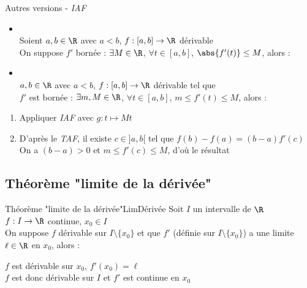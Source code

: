 \documentclass[12pt,a4paper]{report}
\begin{document}
\pagebreak

\begin{theoreme}{Autres versions - \textit{IAF}}{}
\begin{itemize}
    \item {} \\
    Soient $a,b \in \R$ avec $a<b$, $f:[a,b]\to \R$ dérivable\\
    On suppose $f'$ bornée : $\exists M \in \R$, $\forall t \in [a,b]$, $\abs{f'(t)} \leq M$, alors : 
    \begin{center}
    \end{center}
    
    \item {} \\
    $a,b\in \R$ avec $a<b$, $f:[a,b]\to \R$ dérivable tel que \\$f'$ est bornée : $\exists m,M \in \R$, $\forall t \in [a,b]$, $m\leq f'(t) \leq M$, alors :
    \begin{center}
    \end{center}
    
\end{itemize}
\end{theoreme}

\begin{demo}
\begin{enumerate}
    \item
    Appliquer \textit{IAF} avec $g:t \mapsto Mt$
    \item 
    D'après le \textit{TAF}, il existe $c\in]a,b[$ tel que $f(b)-f(a)=(b-a)f'(c)$\\
    On a $(b-a)>0$ et $m\leq f'(c)\leq M$, d'où le résultat
    
\end{enumerate}
\end{demo}

\subsection{Théorème "limite de la dérivée"}
\begin{theoreme}{Théorème "limite de la dérivée"}{LimDérivée}
Soit $I$ un intervalle de $\R$\\
$f:I \to \R$ continue, $x_0 \in I$\\
On suppose $f$ dérivable sur $I\setminus \lbrace x_0 \rbrace$ et que $f'$ (définie sur $I\setminus \lbrace x_0 \rbrace$) a une limite $\ell\in\R$ en $x_0$, alors :
\begin{center}
    $f$ est dérivable sur $x_0$, $f'(x_0)=\ell$\\
    $f$ est donc dérivable sur $I$ et $f'$ est continue en $x_0$
\end{center}
\end{theoreme}
\end{document}
